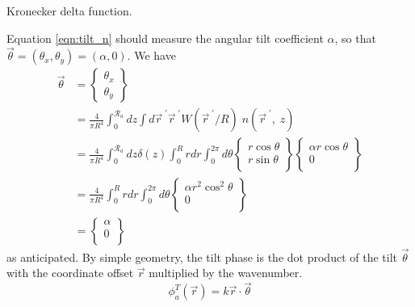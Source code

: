 Kronecker delta function.
\begin{notes}
\end{notes}
Equation \ref{eqn:tilt_n} should measure the
angular tilt coefficient $\alpha$, so that $\vec{\theta} =
\left(\theta_{x}, \theta_{y}\right) = \left(\alpha, 0\right)$.  We
have
\begin{equation}
\begin{aligned}
\vec{\theta} & = 
\left\{
\begin{array}{c}
\theta_{x} \\
\theta_{y} 
\end{array} 
\right\}\\
& = 
\frac{4}{\pi R^{4}} \int_{0}^{\mathcal{R}_{a}} dz 
\int d\vec{r}^{\;\prime} \vec{r}^{\;\prime} W(\vec{r}^{\;\prime}/R) \;
n(\vec{r}^{\;\prime}, \;z) \\
& = 
\frac{4}{\pi R^{4}} \int_{0}^{\mathcal{R}_{a}} dz \delta\left(z\right)
\int_{0}^{R} r dr \int_{0}^{2\pi} d\theta 
\left\{
\begin{array}{c}
r \cos \theta \\
r \sin \theta \\ 
\end{array}
\right\}
\left\{
\begin{array}{c}
\alpha r \cos \theta \\
0 \\ 
\end{array}
\right\} \\
& = 
\frac{4}{\pi R^{4}}  
\int_{0}^{R} r dr \int_{0}^{2\pi} d\theta 
\left\{
\begin{array}{c}
\alpha r^{2} \cos^{2} \theta \\
0 \\ 
\end{array}
\right\}\\
& = 
\left\{
\begin{array}{c}
\alpha \\
0 \\ 
\end{array}
\right\}
\end{aligned}
\end{equation}
as anticipated.  By simple geometry, the tilt phase is the dot product
of the tilt $\vec{\theta}$ with the coordinate offset
$\vec{r}$ multiplied by the wavenumber.
\begin{equation}\label{eqn:tiltphase_n}
\phi^{T}_{a}\left(\vec{r}\right) = k \vec{r}  \cdot \vec{\theta} 
\end{equation}

